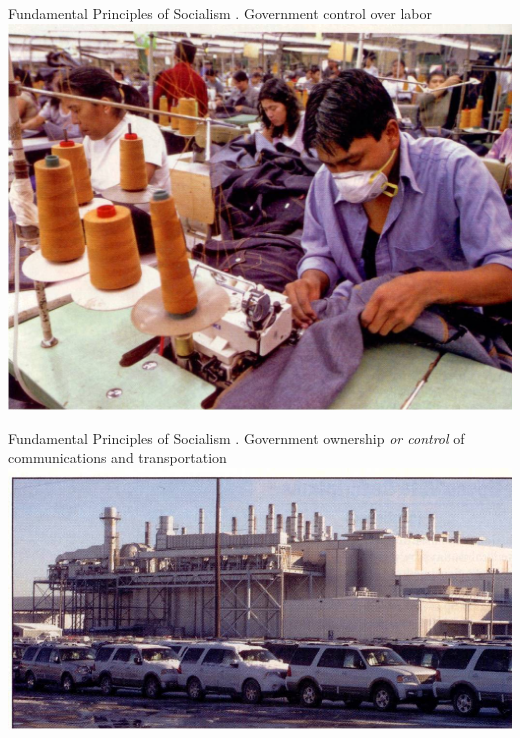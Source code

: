 \begin{frame}[t]{Fundamental Principles of Socialism}
    . Government control over labor \\
    \includegraphics[width=.9\textwidth]{img/labor.jpg} \\
\end{frame}

\begin{frame}[t]{Fundamental Principles of Socialism}
    . Government ownership \emph{or control} of communications and transportation \\
    \includegraphics[width=.9\textwidth]{img/transportation.jpg} \\
\end{frame}

